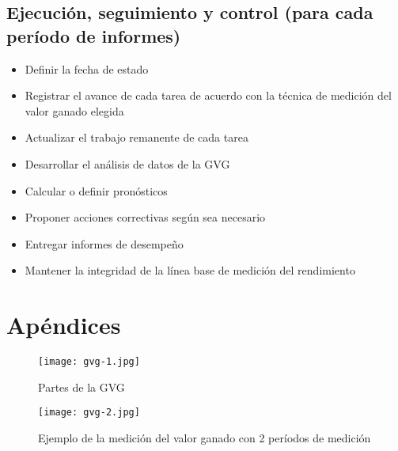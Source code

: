 \documentclass{article}
\begin{document}
\subsection{Ejecución, seguimiento y control (para cada período de informes)}
    \begin{itemize}
            \item Definir la fecha de estado
            \item Registrar el avance de cada tarea de acuerdo con la técnica de medición del valor ganado elegida
            \item Actualizar el trabajo remanente de cada tarea
            \item Desarrollar el análisis de datos de la GVG
            \item Calcular o definir pronósticos
            \item Proponer acciones correctivas según sea necesario
            \item Entregar informes de desempeño
            \item Mantener la integridad de la línea base de medición del rendimiento
    \end{itemize}
    \clearpage
\center    \section{Apéndices}
        \begin{figure}[h]
                \begin{center}
                        \texttt{[image: gvg-1.jpg]}
                \end{center}
                \caption{Partes de la GVG}
        \end{figure}
        \begin{figure}[h]
                \begin{center}
                        \texttt{[image: gvg-2.jpg]}
                \end{center}
                \caption{Ejemplo de la medición del valor ganado con 2 períodos de medición}
        \end{figure}
\end{document}
